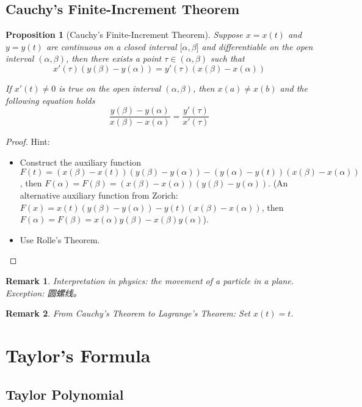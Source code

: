 \documentclass[onecolumn]{ctexart}
\newtheorem{proposition}{Proposition}
\newtheorem{remark}{Remark}
\begin{document}
\subsection{Cauchy's Finite-Increment Theorem}

\begin{proposition}[Cauchy's Finite-Increment Theorem]
  Suppose $x = x(t)$ and $y = y(t)$ are continuous on a closed interval $\lbrack 
  \alpha, \beta \rbrack$ and differentiable on the open interval $(\alpha, 
  \beta)$, then there exists a point $\tau \in (\alpha, \beta)$ such that
  \begin{equation}
    x'(\tau)(y(\beta) - y(\alpha)) = y'(\tau)(x(\beta) - x(\alpha))
  \end{equation}

  If $x'(t) \neq 0$ is true on the open interval $(\alpha, \beta)$, then $x(a) 
  \neq x(b)$ and the following equation holds
  \begin{equation}
    \frac{y(\beta) - y(\alpha)}{x(\beta) - x(\alpha)} = \frac{y'(\tau)}{x'(\tau)}
  \end{equation}
\end{proposition}
\begin{proof}
  Hint:
  \begin{itemize}
    \item Construct the auxiliary function $F(t) = (x(\beta) - x(t))(y(\beta) - 
    y(\alpha)) - (y(\alpha) - y(t))(x(\beta) - x(\alpha))$, then $F(\alpha) = 
    F(\beta) = (x(\beta) - x(\alpha))(y(\beta) - y(\alpha))$. (An alternative 
    auxiliary function from Zorich: $F(x) = x(t)(y(\beta) - y(\alpha)) - 
    y(t)(x(\beta) - x(\alpha))$, then $F(\alpha) = F(\beta) = x(\alpha)y(\beta) - 
    x(\beta)y(\alpha)$).
    \item Use Rolle's Theorem.
  \end{itemize}
\end{proof}
\begin{remark}
  Interpretation in physics: the movement of a particle in a plane. Exception: 圆螺线。
\end{remark}
\begin{remark}
  From Cauchy's Theorem to Lagrange's Theorem: Set $x(t) = t$.
\end{remark}

\section{Taylor's Formula}

\subsection{Taylor Polynomial}
\end{document}
